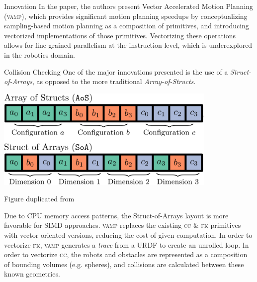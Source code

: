 \documentclass{beamer}
\begin{document}
\begin{frame}[allowframebreaks]{Innovation}
In the paper, the authors present Vector Accelerated Motion Planning (\textsc{vamp}), which provides significant motion planning speedups by conceptualizing sampling-based motion planning as a composition of primitives, and introducing vectorized implementations of those primitives. Vectorizing these operations allows for fine-grained parallelism at the instruction level, which is underexplored in the robotics domain.

\end{frame}

\begin{frame}[allowframebreaks]{Collision Checking}
One of the major innovations presented is the use of a \textit{Struct-of-Arrays}, as opposed to the more traditional \textit{Array-of-Structs}. 

\includegraphics[width=0.8\textwidth]{./assets/soa_aos.png}

Figure duplicated from \cite{paper:MiM}

Due to CPU memory access patterns, the Struct-of-Arrays layout is more favorable for SIMD approaches. \textsc{vamp} replaces the existing \textsc{cc} \& \textsc{fk} primitives with vector-oriented versions, reducing the cost of given computation. 
In order to vectorize \textsc{fk}, \textsc{vamp} generates a \textit{trace} from a URDF to create an unrolled loop. 
In order to vectorize \textsc{cc}, the robots and obstacles are represented as a composition of bounding volumes (e.g. spheres), and collisions are calculated between these known geometries.
\end{frame}
\end{document}
